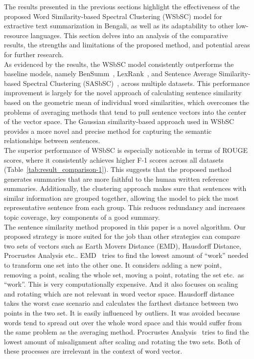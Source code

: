 The results presented in the previous sections highlight the effectiveness of the
proposed Word Similarity-based Spectral Clustering (WSbSC) model for extractive text summarization
in Bengali, as well as its adaptability to other low-resource languages.
This section delves into an analysis of the comparative results, the strengths and limitations of the proposed method,
and potential areas for further research.\\

As evidenced by the results, the WSbSC model consistently outperforms the baseline models,
namely BenSumm~\cite{das-2022-tfidf}, LexRank~\cite{Erkan-lexRank-2004}, and Sentence Average Similarity-based
Spectral Clustering (SASbSC)~\cite{roychowdhury-etal-2022-spectral-base}, across multiple datasets.
This performance improvement is largely for the novel approach of calculating
sentence similarity based on the geometric mean of individual word similarities, which overcomes
the problems of averaging methods that tend to pull sentence vectors into the center of the vector space.
The Gaussian similarity-based approach used in WSbSC provides a more novel and precise method for
capturing the semantic relationships between sentences.\\

The superior performance of WSbSC is especially noticeable in terms of ROUGE scores,
where it consistently achieves higher F-1 scores across all datasets (Table~\ref{tab:result_comparison-1}).
This suggests that the proposed method generates summaries that are more faithful to the
human written reference summaries.
Additionally, the clustering approach makes sure that sentences with similar information
are grouped together, allowing the model to pick the most representative sentence from each group.
This reduces redundancy and increases topic coverage, key components of a good summary.\\

The sentence similarity method proposed in this paper is a novel algorithm.
Our proposed strategy is more suited for the job than other strategies can compare two sets of vectors
such as Earth Movers Distance (EMD), Hausdorff Distance, Procrustes Analysis etc..
EMD~\cite{Rubner-19998-emd} tries to find the lowest amount of ``work'' needed to transform one set into the other one.
It considers adding a new point, removing a point, scaling the whole set, moving a point,
rotating the set etc.\ as ``work''.
This is very computationally expensive.
And it also focuses on scaling and rotating which are not relevant in word vector space.
Hausdorff distance~\cite{hausdorff-1914-hausdorff-distance} takes the worst case scenario
and calculates the farthest distance between two points in the two set.
It is easily influenced by outliers.
It was avoided because words tend to spread out over the whole word space and this would suffer
from the same problem as the averaging method.
Procrustes Analysis~\cite{Gower-1975-procrustes-distance} tries to find the lowest
amount of misalignment after scaling and rotating the two sets.
Both of these processes are irrelevant in the context of word vector.\\

